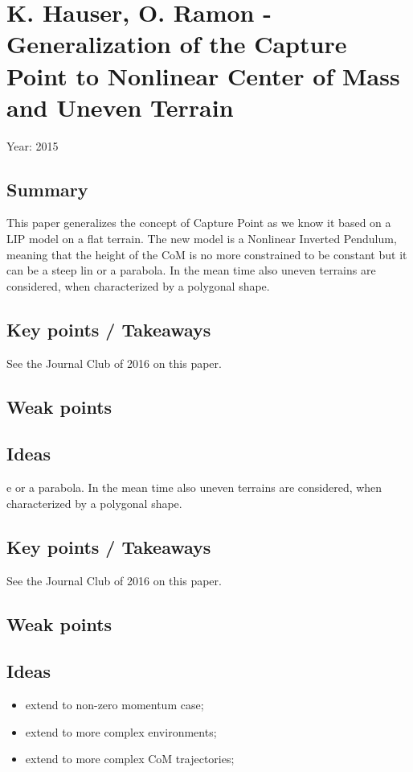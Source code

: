 \section{K. Hauser, O. Ramon - Generalization of the Capture Point to Nonlinear Center of Mass and Uneven Terrain \cite{RamonHauser2015}}
Year: 2015
\subsection*{Summary}
This paper generalizes the concept of Capture Point as we know it based on a LIP model on a flat terrain. The new model is a Nonlinear Inverted Pendulum, meaning that the height of the CoM is no more constrained to be constant but it can be a steep lin or a parabola. In the mean time also uneven terrains are considered, when characterized by a polygonal shape.
\subsection*{Key points / Takeaways}
See the Journal Club of 2016 on this paper.
\subsection*{Weak points}
\subsection*{Ideas}e or a parabola. In the mean time also uneven terrains are considered, when characterized by a polygonal shape.
\subsection*{Key points / Takeaways}
See the Journal Club of 2016 on this paper.
\subsection*{Weak points}
\subsection*{Ideas}
\begin{itemize}
\item extend to non-zero momentum case;
\item extend to more complex environments;
\item extend to more complex CoM trajectories;
\end{itemize}
